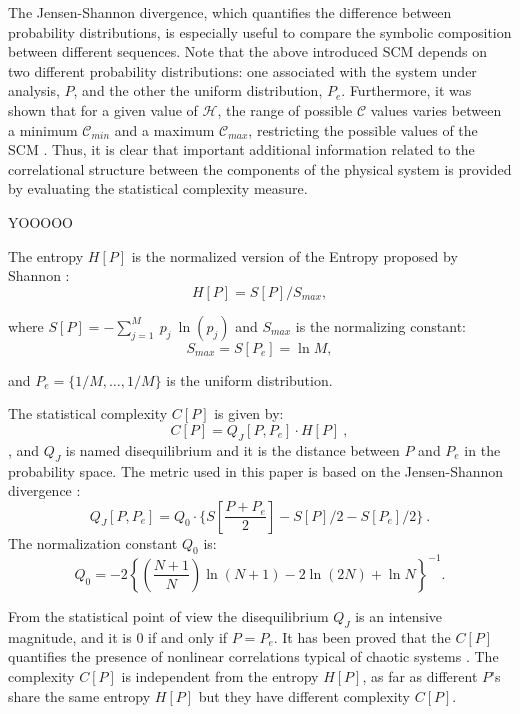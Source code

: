 The Jensen-Shannon divergence, which quantifies the difference between probability distributions, is especially useful to compare the symbolic composition between different sequences\cite{JS-Div1991,Grosse2002,JS-Div2014}.
Note that the above introduced SCM depends on two different probability distributions: one associated with the system under analysis, $P$, and the other the uniform distribution, $P_e$.
Furthermore, it was shown that for a given value of ${\mathcal H}$, the range of possible ${\mathcal C}$ values varies between a minimum ${\mathcal C}_{min}$ and a maximum ${\mathcal C}_{max}$, restricting the possible values of the SCM \cite{Martin2006}.
Thus, it is clear that important additional information related to the correlational structure between the components of the physical system is provided by evaluating the statistical complexity measure. 

YOOOOO

The entropy $H[P]$ is the normalized version of the Entropy proposed by Shannon \cite{Shannon1948}:%
%
\begin{equation}\label{eq:sha}
H[P] = S[P] /S_{max},
\end{equation}

\noindent where $S[P]=-\sum _{j=1}^{M}~p_j~\ln( p_j )$ and $S_{max}$ is the normalizing constant:%
%
\begin{equation}
\label{eq:Smax} S_{max}= S[P_e] = \ln M,
\end{equation}

\noindent and $P_e=\{ 1/M, \dots,1/M\}$ is the uniform distribution.

The statistical complexity $C[P]$ is given by:
\begin{equation}
\label{eq:inten}
C[{P}]=Q_{J}[{P,P_e}]\cdot H[{P}] \ ,
\end{equation}
, and
$Q_{J}$ is named disequilibrium and it is the distance between $P$ and $P_e$ in the probability space.
The metric used in this paper is based on the Jensen-Shannon divergence \cite{Lamberti2004}:%
%
\begin{equation}
\label{eq:disequi}
Q_{J}[{P,P_e}]= Q_0 \cdot \{S[\frac{P+P_e}{2}]-S[P]/2-S[P_e]/2 \} \ .
\end{equation}
%
\noindent The normalization constant $Q_0$ is:
\begin{equation}
\label{eq:q0j}
Q_0=-2 \left\{ \left( \frac{N+1}{N} \right) \ln(N+1) - 2 \ln(2N) + \ln N \right\}^{-1} .
\end{equation}

From the statistical point of view the disequilibrium $Q_J$ is an intensive magnitude, and it is $0$ if and only if $P=P_e$.
It has been proved that the $C[P]$ quantifies the presence of nonlinear correlations typical of chaotic systems \cite{Martin2003,Lamberti2004}.
The complexity $C[P]$ is independent from the entropy $H[P]$, as far as different $P$'s share the same entropy $H[P]$ but they have different complexity $C[P]$.

